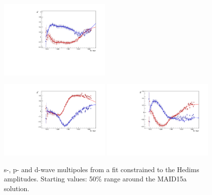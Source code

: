 \documentclass[a4paper,12pt]{report}
\begin{document}
\begin{figure}
\begin{center}
{    \includegraphics[width=0.49\textwidth]{MAID2015a/Hedim/plots.0/E2m.pdf}
    }
    \centerline{
    \includegraphics[width=0.49\textwidth]{MAID2015a/Hedim/plots.0/M2p.pdf}
    \includegraphics[width=0.49\textwidth]{MAID2015a/Hedim/plots.0/M2m.pdf}
    }
    \caption{s-, p- and d-wave multipoles from a fit constrained to the Hedims amplitudes. 
    Starting values: 50\% range around the MAID15a solution.}
\label{Fig:const4}
  \end{center}
\end{figure}
\end{document}
